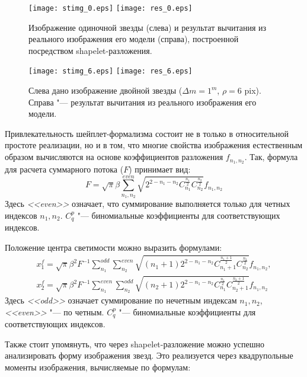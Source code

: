 \begin{figure}
\centering
\texttt{[image: stimg\_0.eps]}
\texttt{[image: res\_0.eps]}
\caption{Изображение одиночной звезды (слева) и результат вычитания из реального изображения его модели (справа), построенной посредством shapelet-разложения.}
\label{fig:model-stars}
\end{figure}

\begin{figure}
\centering
\texttt{[image: stimg\_6.eps]}
\texttt{[image: res\_6.eps]}
\caption{Слева дано изображение двойной звезды ($\Delta m=1^m$, $\rho=6$ pix). Справа "--- результат вычитания из реального изображения его модели.}
\label{fig:model-bin-stars}
\end{figure}

Привлекательность шейплет-формализма состоит не в только в относительной простоте реализации, но и в том, что многие свойства изображения естественным образом вычисляются на основе коэффициентов разложения $f_{n_1,n_2}$. Так, формула для расчета суммарного потока ($F$) принимает вид:
\begin{equation}
\label{eq:SHFlux}
 F = \sqrt{\pi} \beta \sum^{even}_{n_1,n_2} \sqrt{2^{2-n_1-n_2}C^{\frac{n_1}{2}}_{n_1}C^{\frac{n_2}{2}}_{n_2}}f_{n_1,n_2}
\end{equation}
Здесь \textit{<<even>>} означает, что суммирование выполняется только для четных индексов $n_1,n_2$. $C^{p}_{q}$ "--- биномиальные коэффициенты для соответствующих индексов.

Положение центра светимости можно выразить формулами:
\begin{align}\label{eq:SHPhCent}
 x_1^f = \sqrt{\pi} \beta^2 F^{-1} \sum^{odd}_{n_1}\sum^{even}_{n_2} \sqrt{
(n_1+1)2^{2-n_1-n_2}C^{\frac{n_1+1}{2}}_{n_1+1}C^{\frac{n_2}{2}}_{n_2}}f_{n_1,n_2}, \\
x_2^f = \sqrt{\pi} \beta^2 F^{-1} \sum^{even}_{n_1}\sum^{odd}_{n_2} \sqrt{
(n_2+1)2^{2-n_1-n_2}C^{\frac{n_1}{2}}_{n_1}C^{\frac{n_2+1}{2}}_{n_2+1}}f_{n_1,n_2}
\end{align}
Здесь \textit{<<odd>>} означает суммирование по нечетным индексам $n_1,n_2$, \textit{<<even>>} "--- по четным. $C^{p}_{q}$ "--- биномиальные коэффициенты для соответствующих индексов.

Также стоит упомянуть, что через shapelet-разложение можно успешно анализировать форму изображения звезд. Это реализуется через квадрупольные моменты изображения,  вычисляемые по формулам:

